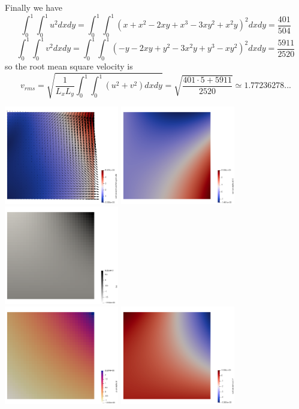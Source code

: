 Finally we have
\[
\int_0^1 \int_0^1 u^2 dxdy=
\int_0^1 \int_0^1 ( x+x^2 - 2xy+x^3 - 3xy^2 + x^2y  )^2 dx dy = \frac{401}{504} 
\]
\[
\int_0^1 \int_0^1 v^2 dxdy=
\int_0^1 \int_0^1 (-y-2xy+y^2 -3x^2y + y^3 - xy^2  )^2 dx dy = \frac{5911}{2520}
\]
so the root mean square velocity is
\[
v_{rms} = \sqrt{ \frac{1}{L_x L_y}  \int_0^1 \int_0^1 (u^2+v^2) dx dy }  
= \sqrt{\frac{401\cdot 5 + 5911}{2520}}\simeq 1.77236278... 
\]


\begin{center}
\includegraphics[width=5cm]{images/benchmark_db2d/vel}
\includegraphics[width=5cm]{images/benchmark_db2d/u}
\includegraphics[width=5cm]{images/benchmark_db2d/bx}\\
\includegraphics[width=5cm]{images/benchmark_db2d/press}
\includegraphics[width=5cm]{images/benchmark_db2d/v}

\end{center}

